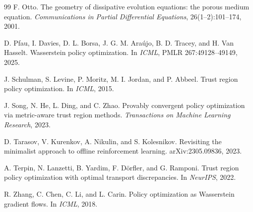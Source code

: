 \begin{thebibliography}{99}
F. Otto. The geometry of dissipative evolution equations: the porous medium equation. \emph{Communications in Partial Differential Equations}, 26(1--2):101--174, 2001.

D. Pfau, I. Davies, D. L. Borsa, J. G. M. Ara\'ujo, B. D. Tracey, and H. Van Hasselt. Wasserstein policy optimization. In \emph{ICML}, PMLR 267:49128--49149, 2025.

J. Schulman, S. Levine, P. Moritz, M. I. Jordan, and P. Abbeel. Trust region policy optimization. In \emph{ICML}, 2015.

J. Song, N. He, L. Ding, and C. Zhao. Provably convergent policy optimization via metric-aware trust region methods. \emph{Transactions on Machine Learning Research}, 2023.

D. Tarasov, V. Kurenkov, A. Nikulin, and S. Kolesnikov. Revisiting the minimalist approach to offline reinforcement learning. arXiv:2305.09836, 2023.

A. Terpin, N. Lanzetti, B. Yardim, F. D\"orfler, and G. Ramponi. Trust region policy optimization with optimal transport discrepancies. In \emph{NeurIPS}, 2022.

R. Zhang, C. Chen, C. Li, and L. Carin. Policy optimization as Wasserstein gradient flows. In \emph{ICML}, 2018.
\end{thebibliography}
